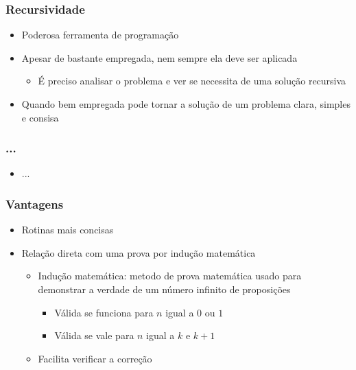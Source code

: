 \documentclass[aspectratio=169]{beamer}
\begin{document}
\begin{frame}\frametitle{Recursividade}
\begin{itemize}
	\item Poderosa ferramenta de programação
	\item Apesar de bastante empregada, nem sempre ela deve ser aplicada
	\begin{itemize}
		\item É preciso analisar o problema e ver se necessita de uma solução recursiva
	\end{itemize}
	\item Quando bem empregada pode tornar a solução de um problema clara, simples e consisa
\end{itemize}
\end{frame}

\begin{frame}\frametitle{...}
\begin{itemize}
	\item ...	
\end{itemize}
\end{frame}

\begin{frame}\frametitle{Vantagens}
\begin{itemize}
	\item Rotinas mais concisas
	\item Relação direta com uma prova por indução matemática
	\begin{itemize}
		\item Indução matemática: metodo de prova matemática usado para demonstrar a verdade de um número infinito de proposições
		\begin{itemize}
			\item Válida se funciona para $n$ igual a $0$ ou $1$
			\item Válida se vale para $n$ igual a $k$ e $k + 1$
		\end{itemize}
		\item Facilita verificar a correção
	\end{itemize}
\end{itemize}
\end{frame}
\end{document}
